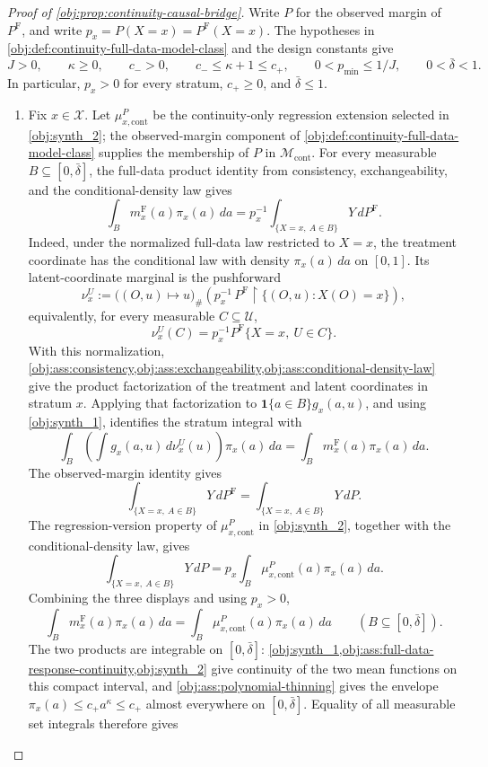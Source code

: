 \documentclass[11pt]{article}
\begin{document}
\begin{proof}[Proof of \cref{obj:prop:continuity-causal-bridge}]
Write \(P\) for the observed margin of \(P^{\mathrm F}\), and write \(p_x=P(X=x)=P^{\mathrm F}(X=x)\).  The hypotheses in \cref{obj:def:continuity-full-data-model-class} and the design constants give
\[
J>0,\qquad \kappa\ge0,\qquad c_->0,\qquad c_-\le \kappa+1\le c_+,
\qquad 0<p_{\min}\le 1/J,
\qquad 0<\bar\delta<1.
\]
In particular, \(p_x>0\) for every stratum, \(c_+\ge0\), and \(\bar\delta\le1\).

\begin{enumerate}
\item Fix \(x\in\mathcal X\).  Let \(\mu_{x,\mathrm{cont}}^P\) be the continuity-only regression extension selected in \cref{obj:synth_2}; the observed-margin component of \cref{obj:def:continuity-full-data-model-class} supplies the membership of \(P\) in \(\mathcal M_{\mathrm{cont}}\).  For every measurable \(B\subseteq[0,\bar\delta]\), the full-data product identity from consistency, exchangeability, and the conditional-density law gives
\[
\int_B m_x^{\mathrm F}(a)\pi_x(a)\,da
=
p_x^{-1}\int_{\{X=x,\ A\in B\}}Y\,dP^{\mathrm F}.
\]
Indeed, under the normalized full-data law restricted to \(X=x\), the treatment coordinate has the conditional law with density \(\pi_x(a)\,da\) on \([0,1]\).  Its latent-coordinate marginal is the pushforward
\[
\nu_x^{U}
:=
\bigl((O,u)\mapsto u\bigr)_{\#}
\left(p_x^{-1}\,P^{\mathrm F}\!\restriction\{(O,u):X(O)=x\}\right),
\]
equivalently, for every measurable \(C\subseteq\mathcal U\),
\[
\nu_x^{U}(C)=p_x^{-1}P^{\mathrm F}\{X=x,\ U\in C\}.
\]
With this normalization, \cref{obj:ass:consistency,obj:ass:exchangeability,obj:ass:conditional-density-law} give the product factorization of the treatment and latent coordinates in stratum \(x\).  Applying that factorization to \(\mathbf 1\{a\in B\}g_x(a,u)\), and using \cref{obj:synth_1}, identifies the stratum integral with
\[
\int_B\left(\int g_x(a,u)\,d\nu_x^{U}(u)\right)\pi_x(a)\,da
=
\int_B m_x^{\mathrm F}(a)\pi_x(a)\,da .
\]
The observed-margin identity gives
\[
\int_{\{X=x,\ A\in B\}}Y\,dP^{\mathrm F}
=
\int_{\{X=x,\ A\in B\}}Y\,dP .
\]
The regression-version property of \(\mu_{x,\mathrm{cont}}^P\) in \cref{obj:synth_2}, together with the conditional-density law, gives
\[
\int_{\{X=x,\ A\in B\}}Y\,dP
=
p_x\int_B \mu_{x,\mathrm{cont}}^P(a)\pi_x(a)\,da .
\]
Combining the three displays and using \(p_x>0\),
\[
\int_B m_x^{\mathrm F}(a)\pi_x(a)\,da
=
\int_B \mu_{x,\mathrm{cont}}^P(a)\pi_x(a)\,da
\qquad
(B\subseteq[0,\bar\delta]).
\]
The two products are integrable on \([0,\bar\delta]\): \cref{obj:synth_1,obj:ass:full-data-response-continuity,obj:synth_2} give continuity of the two mean functions on this compact interval, and \cref{obj:ass:polynomial-thinning} gives the envelope \(\pi_x(a)\le c_+a^\kappa\le c_+\) almost everywhere on \([0,\bar\delta]\).  Equality of all measurable set integrals therefore gives

\end{enumerate}
\end{proof}
\end{document}
